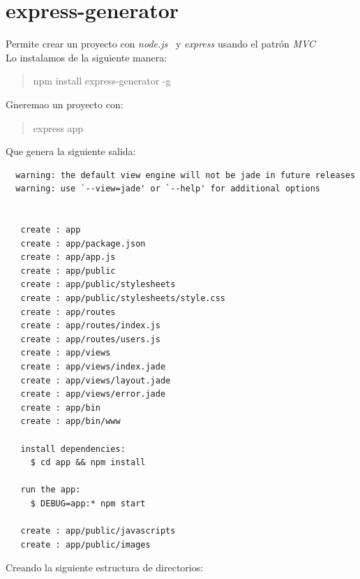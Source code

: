 \documentclass[4paper]{article}
\newcommand{\N}{node.js}
\begin{document}
\newpage

\section{express-generator}
Permite crear un proyecto con \emph{\N} ~y \emph{express} usando el patrón \emph{MVC}\\
Lo instalamos de la siguiente manera:
\begin{quote}
 npm install express-generator -g
\end{quote}
Gneremao un proyecto con:
\begin{quote}
express app
\end{quote}
Que genera la siguiente salida:
\begin{verbatim}
  warning: the default view engine will not be jade in future releases
  warning: use `--view=jade' or `--help' for additional options


   create : app
   create : app/package.json
   create : app/app.js
   create : app/public
   create : app/public/stylesheets
   create : app/public/stylesheets/style.css
   create : app/routes
   create : app/routes/index.js
   create : app/routes/users.js
   create : app/views
   create : app/views/index.jade
   create : app/views/layout.jade
   create : app/views/error.jade
   create : app/bin
   create : app/bin/www

   install dependencies:
     $ cd app && npm install

   run the app:
     $ DEBUG=app:* npm start

   create : app/public/javascripts
   create : app/public/images

\end{verbatim}
\newpage
Creando la siguiente estructura de directorios:
\end{document}
